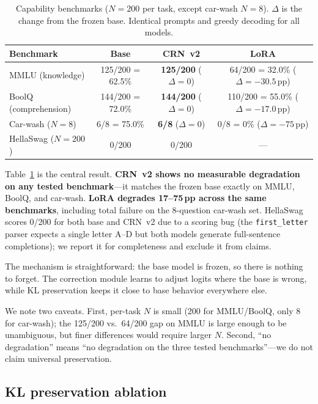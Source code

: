 \documentclass[11pt]{article}
\begin{document}
\begin{table}[ht]
\centering
\footnotesize
\setlength{\tabcolsep}{4pt}
\caption{Capability benchmarks ($N{=}200$ per task, except car-wash $N{=}8$). $\Delta$ is the change from the frozen base. Identical prompts and greedy decoding for all models.}
\begin{tabular}{@{}lccc@{}}
\toprule
Benchmark & Base & CRN~v2 & LoRA \\
\midrule
MMLU (knowledge) & 125/200 = 62.5\% & \textbf{125/200} ($\Delta{=}0$) & 64/200 = 32.0\% ($\Delta{=}{-}30.5$\,pp) \\
BoolQ (comprehension) & 144/200 = 72.0\% & \textbf{144/200} ($\Delta{=}0$) & 110/200 = 55.0\% ($\Delta{=}{-}17.0$\,pp) \\
Car-wash ($N{=}8$) & 6/8 = 75.0\% & \textbf{6/8} ($\Delta{=}0$) & 0/8 = 0\% ($\Delta{=}{-}75$\,pp) \\
HellaSwag ($N{=}200$) & 0/200 & 0/200 & --- \\
\bottomrule
\end{tabular}
\label{tab:capability}
\end{table}

Table~\ref{tab:capability} is the central result.
\textbf{CRN~v2 shows no measurable degradation on any tested benchmark}---it matches the frozen base exactly on MMLU, BoolQ, and car-wash.
\textbf{LoRA degrades 17--75\,pp across the same benchmarks}, including total failure on the 8-question car-wash set.
HellaSwag scores 0/200 for both base and CRN~v2 due to a scoring bug (the \texttt{first\_letter} parser expects a single letter A--D but both models generate full-sentence completions); we report it for completeness and exclude it from claims.

The mechanism is straightforward: the base model is frozen, so there is nothing to forget.
The correction module learns to adjust logits where the base is wrong, while KL preservation keeps it close to base behavior everywhere else.

We note two caveats.
First, per-task $N$ is small (200 for MMLU/BoolQ, only 8 for car-wash); the 125/200 vs.\ 64/200 gap on MMLU is large enough to be unambiguous, but finer differences would require larger $N$.
Second, ``no degradation'' means ``no degradation on the three tested benchmarks''---we do not claim universal preservation.

\subsection{KL preservation ablation}
\label{sec:kl}
\end{document}
